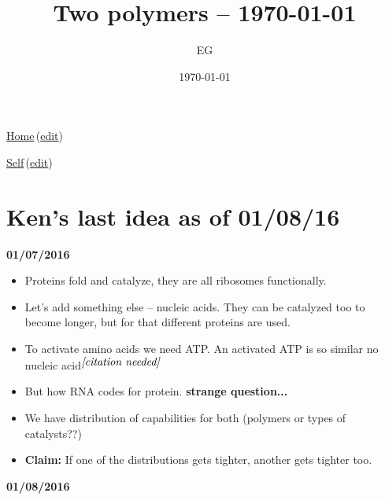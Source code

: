 \documentclass[12pt]{paper}
\title{Two polymers -- \today}
\author{EG}
\date{\today}
\newcommand{\wikilink}[2] { \href{#1.pdf}{#2}\,(\href{#1.tex}{edit})}
\newcommand{\ncite}{$^{\mbox{\textit{[citation needed]}}}$}
\begin{document}
 \maketitle
\wikilink{home}{Home}

\wikilink{twoPolymers}{Self}
 \tableofcontents
\section{Ken's last idea as of 01/08/16}
\textbf{01/07/2016}
\begin{itemize}
 \item Proteins fold and catalyze, they are all ribosomes functionally.
\item Let's add something else -- nucleic acids. They can be catalyzed too to become longer, but 
for that different proteins are used.  
\item To activate amino acids we need ATP. An activated ATP is so similar no nucleic acid\ncite
\item But how RNA codes for protein. \textbf{strange question...}
\item We have distribution of capabilities for both (polymers or types of catalysts??)
\item \textbf{Claim:} If one of the distributions gets tighter, another gets tighter too.
\end{itemize}
\textbf{01/08/2016}
\end{document}
